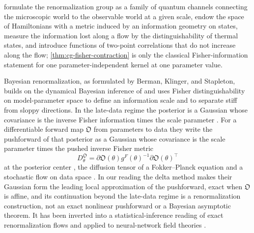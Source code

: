 \citet{beny2015information} formulate the renormalization group as a family of
quantum channels connecting the microscopic world to the observable world at a
given scale, endow the space of Hamiltonians with a metric induced by an
information geometry on states, measure the information lost along a flow by the
distinguishability of thermal states, and introduce functions of two-point
correlations that do not increase along the flow; \cref{thm:cg-fisher-contraction}
is only the classical Fisher-information statement for one parameter-independent
kernel at one parameter value.

Bayesian renormalization, as formulated by Berman, Klinger, and Stapleton, builds
on the dynamical Bayesian inference of \citet{BermanHeckmanKlinger2022} and uses
Fisher distinguishability on model-parameter space to define an information
scale and to separate stiff from sloppy directions. In the late-data regime the
posterior is a Gaussian whose covariance is the inverse Fisher information times
the scale parameter \citep[Eq.~(38)]{BermanKlingerStapleton2023}. For a
differentiable forward map \(\mathfrak O\) from parameters to data they write the
pushforward of that posterior as a Gaussian
\citep[Eq.~(43)]{BermanKlingerStapleton2023} whose covariance is the scale
parameter times the pushed inverse Fisher metric
\begin{equation}
D^{\mathfrak O}_\theta
=\partial\mathfrak O(\theta)g^F(\theta)^{-1}\partial\mathfrak O(\theta)^\top
\label{eq:rg-bks-diffusion}
\end{equation}
at the posterior center \citep[Eq.~(44)]{BermanKlingerStapleton2023}, the
diffusion tensor of a Fokker--Planck equation and a stochastic flow on data
space \citep[Eqs.~(45) and~(46)]{BermanKlingerStapleton2023}. In our reading the
delta method makes their Gaussian form the leading local approximation of the
pushforward, exact when \(\mathfrak O\) is affine, and its continuation beyond
the late-data regime is a renormalization construction, not an exact nonlinear
pushforward or a Bayesian asymptotic theorem. It has been inverted into a
statistical-inference reading of exact renormalization flows
\citep{BermanKlinger2024Inverse} and applied to neural-network field theories
\citep{HowardKlingerMaitiStapleton2025}.

